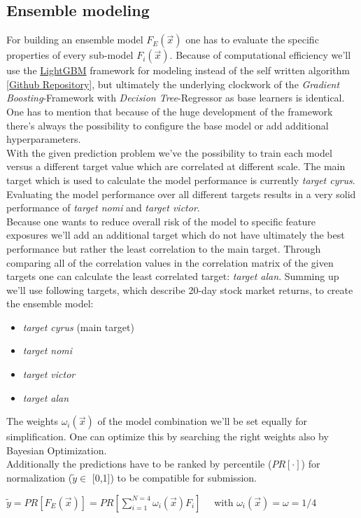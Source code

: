 \documentclass[12pt, a4paper]{article}
\begin{document}
\subsection{Ensemble modeling}
For building an ensemble model $F_E(\vec{x})$ one has to evaluate the specific properties of every sub-model $F_i(\vec{x})$. Because of computational efficiency we'll use the \href{https://lightgbm.readthedocs.io/en/stable/}{LightGBM} framework for modeling instead of the self written algorithm [\href{https://github.com/probabilis/bs_ml}{Github Repository}], but ultimately the underlying clockwork of the \textit{Gradient Boosting}-Framework with \textit{Decision Tree}-Regressor as base learners is identical. One has to mention that because of the huge development of the framework there's always the possibility to configure the base model or add additional hyperparameters.\\
With the given prediction problem we've the possibility to train each model versus a different target value which are correlated at different scale. The main target which is used to calculate the model performance is currently \textit{target cyrus}. Evaluating the model performance over all different targets results in a very solid performance of \textit{target nomi} and  \textit{target victor}. \\
Because one wants to reduce overall risk of the model to specific feature exposures we'll add an additional target which do not have ultimately the best performance but rather the least correlation to the main target. Through comparing all of the correlation values in the correlation matrix of the given targets one can calculate the least correlated target: \textit{target alan}. Summing up we'll use following targets, which describe 20-day stock market returns, to create the ensemble model: \\
\begin{itemize}
    \item \textit{target cyrus} (main target) 
    \item \textit{target nomi}
    \item \textit{target victor}
    \item \textit{target alan}
\end{itemize}
The weights $\omega_i(\vec{x})$ of the model combination we'll be set equally for simplification. One can optimize this by searching the right weights also by Bayesian Optimization. \\ 
Additionally the predictions have to be ranked by percentile ($PR[\cdot]$) for normalization ($\tilde{y} \in$ [0,1]) to be compatible for submission.
\begin{center}
    $\tilde{y} = PR[F_E(\vec{x})] = PR[\sum_{i=1}^{N=4} \omega_i(\vec{x}) F_i] \quad$ with $\omega_i(\vec{x}) = \omega = 1/4$ 
\end{center}
\end{document}
